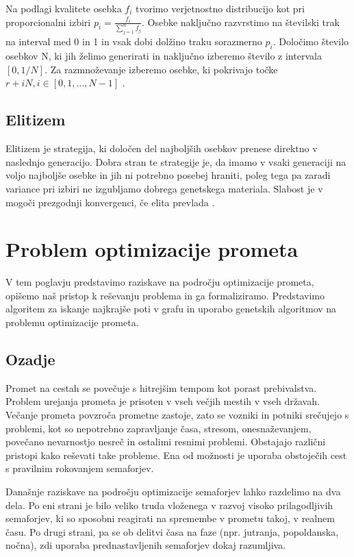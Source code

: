 \documentclass[a4paper, 12pt]{book}
\begin{document}
Na podlagi kvalitete osebka $f_i$ tvorimo verjetnostno distribucijo kot pri proporcionalni izbiri
$p_i = \frac{f_i}{\sum_{j=1}^n f_j}$. Osebke naklju\v cno razvrstimo na \v stevilski trak na interval med 0 in 1 in vsak dobi dol\v zino traku sorazmerno $p_i$. Dolo\v cimo \v stevilo osebkov N, ki jih \v zelimo generirati in naklju\v cno izberemo \v stevilo z intervala $[0, 1/N]$. Za razmno\v zevanje izberemo osebke, ki pokrivajo to\v cke $r + iN, i \in [0, 1, \dots, N -1]$ \cite{inteligentni sistemi}.

\section{Elitizem}
Elitizem je strategija, ki dolo\v cen del najbolj\v sih osebkov prenese direktno v naslednjo generacijo. Dobra stran te strategije je, da imamo v vsaki generaciji na voljo najbolj\v se osebke in jih ni potrebno posebej hraniti, poleg tega pa zaradi variance pri izbiri ne izgubljamo dobrega genetskega materiala. Slabost je v mogo\v ci prezgodnji konvergenci, \v ce elita prevlada
\cite{inteligentni sistemi}.

\chapter{Problem optimizacije prometa}
\label{ch2}
V tem poglavju predstavimo raziskave na podro\v cju optimizacije prometa, opi\v semo na\v s pristop k re\v sevanju problema in ga formaliziramo. Predstavimo algoritem za iskanje najkraj\v se poti v grafu in uporabo genetskih algoritmov na problemu optimizacije prometa.

\section{Ozadje}
Promet na cestah se pove\v cuje s hitrej\v sim tempom kot porast prebivalstva. Problem urejanja prometa je prisoten v vseh ve\v cjih mestih v vseh dr\v zavah. Ve\v canje prometa povzro\v ca prometne zastoje, zato se vozniki in potniki sre\v cujejo s problemi, kot so nepotrebno zapravljanje \v casa, stresom, onesna\v zevanjem, pove\v cano nevarnostjo nesre\v c in ostalimi resnimi problemi. Obstajajo razli\v cni pristopi kako re\v sevati take probleme. Ena od mo\v znosti je uporaba obstoje\v cih cest s pravilnim rokovanjem semaforjev. 

Dana\v snje raziskave na podro\v cju optimizacije semaforjev lahko razdelimo na dva dela. Po eni strani je bilo veliko truda vlo\v zenega v razvoj visoko prilagodljivih semaforjev, ki so sposobni reagirati na spremembe v prometu takoj, v realnem \v casu. Po drugi strani, pa se ob delitvi \v casa na  faze (npr. jutranja, popoldanska, no\v cna), zdi uporaba prednastavljenih semaforjev dokaj razumljiva.
\end{document}
